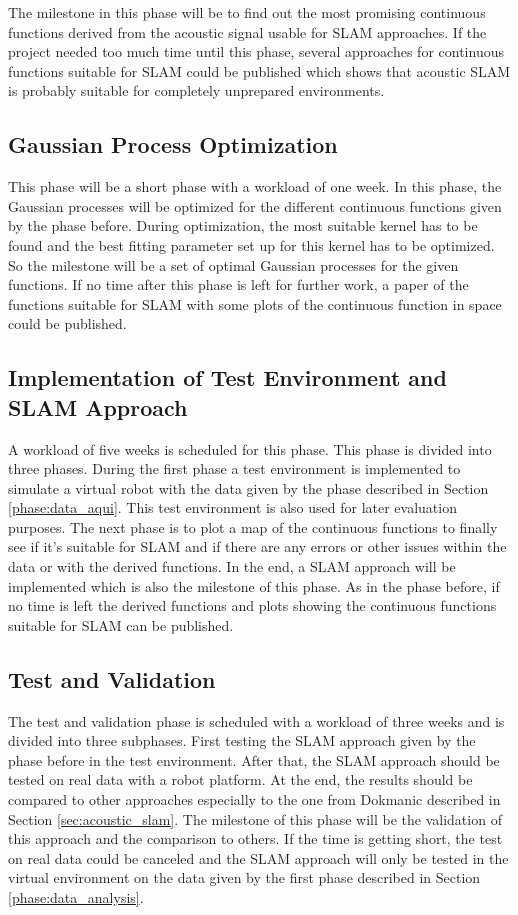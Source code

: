 The milestone in this phase will be to find out the most promising continuous functions derived from the acoustic signal usable for SLAM approaches. If the project needed too much time until this phase, several approaches for continuous functions suitable for SLAM could be published which shows that acoustic SLAM is probably suitable for completely unprepared environments.

\subsection{Gaussian Process Optimization}
This phase will be a short phase with a workload of one week. In this phase, the Gaussian processes will be optimized for the different continuous functions given by the phase before. During optimization, the most suitable kernel has to be found and the best fitting parameter set up for this kernel has to be optimized. So the milestone will be a set of optimal Gaussian processes for the given functions. If no time after this phase is left for further work, a paper of the functions suitable for SLAM with some plots of the continuous function in space could be published.

\subsection{Implementation of Test Environment and SLAM Approach}
A workload of five weeks is scheduled for this phase. This phase is divided into three phases. During the first phase a test environment is implemented to simulate a virtual robot with the data given by the phase described in Section \ref{phase:data_aqui}. This test environment is also used for later evaluation purposes. The next phase is to plot a map of the continuous functions to finally see if it's suitable for SLAM and if there are any errors or other issues within the data or with the derived functions. In the end, a SLAM approach will be implemented which is also the milestone of this phase. As in the phase before, if no time is left the derived functions and plots showing the continuous functions suitable for SLAM can be published. 

\subsection{Test and Validation}
The test and validation phase is scheduled with a workload of three weeks and is divided into three subphases. First testing the SLAM approach given by the phase before in the test environment. After that, the SLAM approach should be tested on real data with a robot platform. At the end, the results should be compared to other approaches especially to the one from Dokmanic \cite{dokmanic_roomrecslam_2016} described in Section \ref{sec:acoustic_slam}. The milestone of this phase will be the validation of this approach and the comparison to others. If the time is getting short, the test on real data could be canceled and the SLAM approach will only be tested in the virtual environment on the data given by the first phase described in Section \ref{phase:data_analysis}. 

